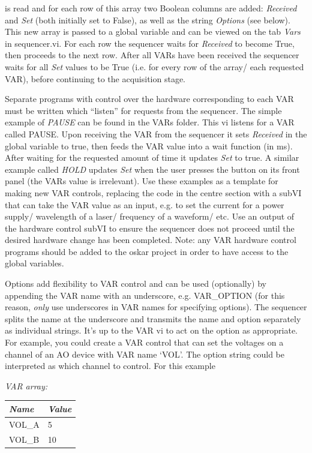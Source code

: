 \documentclass[10pt,a4paper]{article}
\begin{document}
\noindent is read and for each row of this array two Boolean columns are added: \emph{Received} and \emph{Set} (both initially set to False), as well as the string \emph{Options} (see below).  This new array is passed to a global variable and can be viewed on the tab \emph{Vars} in sequencer.vi.  For each row the sequencer waits for \emph{Received} to become True, then proceeds to the next row. After all VARs have been received the sequencer waits for all \emph{Set} values to be True (i.e. for every row of the array/ each requested VAR), before continuing to the acquisition stage.

Separate programs with control over the hardware corresponding to each VAR must be written which ``listen'' for requests from the sequencer.  The simple example of \emph{PAUSE} can be found in the VARs folder.  This vi listens for a VAR called PAUSE. Upon receiving the VAR from the sequencer it sets \emph{Received} in the global variable to true, then feeds the VAR value into a wait function (in ms). After waiting for the requested amount of time it updates \emph{Set} to true.  A similar example called \emph{HOLD} updates \emph{Set} when the user presses the button on its front panel (the VARs value is irrelevant). Use these examples as a template for making new VAR controls, replacing the code in the centre section with a subVI that can take the VAR value as an input, e.g. to set the current for a power supply/ wavelength of a  laser/ frequency of a waveform/ etc.  Use an output of the hardware control subVI to ensure the sequencer does not proceed until the desired hardware change has been completed. Note: any VAR hardware control programs should be added to the oskar project in order to have access to the global variables.

Options add flexibility to VAR control and can be used (optionally) by appending the VAR name with an underscore, e.g. VAR\_OPTION (for this reason, \emph{only} use underscores in VAR names for specifying options).  The sequencer splits the name at the underscore and transmits the name and option separately as individual strings.  It's up to the VAR vi to act on the option as appropriate.  For example, you could create a VAR control that can set the voltages on a channel of an AO device with VAR name `VOL'.  The option string could be interpreted as which channel to control. For this example

\hangindent=0.7cm
\emph{VAR array:} \\
\begin{tabularx}{0.3\textwidth}{X|X}
	\emph{Name} & \emph{Value} \\
	\hline
	VOL\_A & 5 \\
	VOL\_B & 10 \\
\end{tabularx}
\vspace{2mm}
\end{document}
